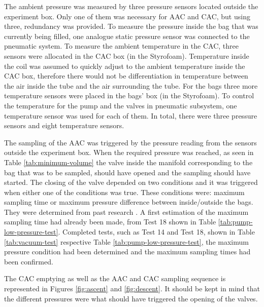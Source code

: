 The ambient pressure was measured by three pressure sensors located outside the experiment box. Only one of them was necessary for AAC and CAC, but using three, redundancy was provided. To measure the pressure inside the bag that was currently being filled, one analogue static pressure sensor was connected to the pneumatic system. To measure the ambient temperature in the CAC, three sensors were allocated in the CAC box (in the Styrofoam). Temperature inside the coil was assumed to quickly adjust to the ambient temperature inside the CAC box, therefore there would not be differentiation in temperature between the air inside the tube and the air surrounding the tube. For the bags three more temperature sensors were placed in the bags' box (in the Styrofoam). To control the temperature for the pump and the valves in pneumatic subsystem, one temperature sensor was used for each of them. In total, there were three pressure sensors and eight temperature sensors. 

The sampling of the AAC was triggered by the pressure reading from the sensors outside the experiment box. When the required pressure was reached, as seen in Table \ref{tab:minimum-volume} the valve inside the manifold corresponding to the bag that was to be sampled, should have opened and the sampling should have started. The closing of the valve depended on two conditions and it was triggered when either one of the conditions was true. These conditions were: maximum sampling time or maximum pressure difference between inside/outside the bags. They were determined from past research \cite{LISA}. A first estimation of the maximum sampling time had already been made, from Test 18 shown in Table \ref{tab:pump-low-pressure-test}. Completed tests, such as Test 14 and Test 18, shown in Table \ref{tab:vacuum-test} respective Table \ref{tab:pump-low-pressure-test}, the maximum pressure condition had been determined and the maximum sampling times had been confirmed.

The CAC emptying as well as the AAC and CAC sampling sequence is represented in Figures \ref{fig:ascent} and \ref{fig:descent}. It should be kept in mind that the different pressures were what should have triggered the opening of the valves. 

